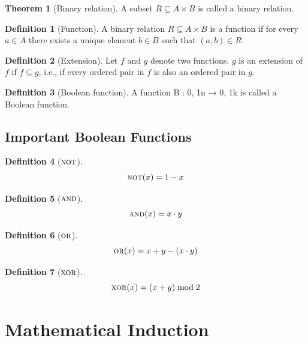 \documentclass[fleqn, a4paper, 12pt, twoside]{article}
\theoremstyle{definition}
\newtheorem{definition}{Definition}
\theoremstyle{theorem}
\newtheorem{theorem}{Theorem}
\newcommand{\Not}{{\textsc{not}}}
\renewcommand{\And}{{\textsc{and}}}
\newcommand{\Or}{{\textsc{or}}}
\newcommand{\Xor}{{\textsc{xor}}}
\begin{document}
\begin{theorem}[Binary relation]
	A subset $R \subseteq A \times B$ is called a binary relation.
\end{theorem}

\begin{definition}[Function]
	A binary relation $R \subseteq A \times B$ is a function if for every $a \in A$ there exists a unique element $b \in B$ such that $(a,b) \in R$.
\end{definition}

\begin{definition}[Extension]
	Let $f$ and $g$ denote two functions. $g$ is an extension of $f$ if $f \subseteq g$, i.e., if every ordered pair in $f$ is also an ordered pair in $g$.
\end{definition}

\begin{definition}[Boolean function]
	A function B : {0, 1}n → {0, 1}k is called a Boolean function.
\end{definition}

\subsection{Important Boolean Functions}

\begin{definition}[$\Not$]
	\begin{equation*}
		\Not(x) = 1 - x
	\end{equation*}
\end{definition}

\begin{definition}[$\And$]
	\begin{equation*}
		\And(x) = x \cdot y
	\end{equation*}
\end{definition}

\begin{definition}[$\Or$]
	\begin{equation*}
		\Or(x) = x + y - (x \cdot y)
	\end{equation*}
\end{definition}

\begin{definition}[$\Xor$]
	\begin{equation*}
		\Xor(x) = (x + y) \bmod{2}
	\end{equation*}
\end{definition}

\section{Mathematical Induction}
\end{document}
